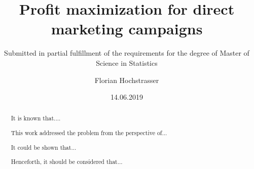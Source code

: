 \begin{titlepage}

\titlehead{Master Thesis}
\title{Profit maximization for direct marketing campaigns}
\subject{An application of data-driven decision making}
\subtitle{Submitted in partial fulfillment of the requirements for the degree of Master of Science in Statistics}
\author{Florian Hochstrasser}
\date{14.06.2019}
\publishers{Supervisor: Jacques Zuber}

\end{titlepage}

\let\maketitle\oldmaketitle
\maketitle

\begin{abstract}

It is known that....

This work addressed the problem from the perspective of...

It could be shown that...

Henceforth, it should be considered that...
\end{abstract}
